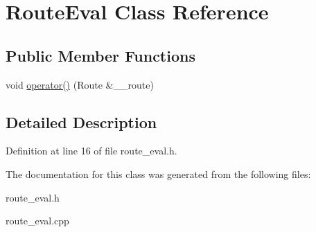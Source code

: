 \hypertarget{classRouteEval}{
\section{Route\-Eval Class Reference}
\label{classRouteEval}
}
\subsection*{Public Member Functions}
\begin{CompactItemize}
\item 
\hypertarget{classRouteEval_e10bbe6f792e6f44405953de4f703901}{
void \hyperlink{classRouteEval_e10bbe6f792e6f44405953de4f703901}{operator()} (Route \&\_\-\_\-route)}
\label{classRouteEval_e10bbe6f792e6f44405953de4f703901}

\end{CompactItemize}


\subsection{Detailed Description}




Definition at line 16 of file route\_\-eval.h.

The documentation for this class was generated from the following files:\begin{CompactItemize}
\item 
route\_\-eval.h\item 
route\_\-eval.cpp\end{CompactItemize}
